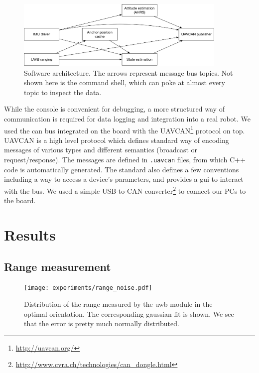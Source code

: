 \documentclass[a4paper, 12pt]{scrreprt}
\begin{document}
\begin{figure}[h]
    \centering
    \includegraphics[width=0.9\textwidth]{figures/architecture.pdf}
    \caption{Software architecture.
    The arrows represent message bus topics.
    Not shown here is the command shell, which can poke at almost every topic to inspect the data.
    }
    \label{fig:architecture}
\end{figure}

While the console is convenient for debugging, a more structured way of communication is required for data logging and integration into a real robot.
We used the \gls{can} bus integrated on the board with the UAVCAN\footnote{\url{http://uavcan.org/}} protocol on top.
UAVCAN is a high level protocol which defines standard way of encoding messages of various types and different semantics (broadcast or request/response).
The messages are defined in \texttt{.uavcan} files, from which C++ code is automatically generated.
The standard also defines a few conventions including a way to access a device's parameters, and provides a \gls{gui} to interact with the bus.
We used a simple USB-to-CAN converter\footnote{\url{http://www.cvra.ch/technologies/can_dongle.html}} to connect our PCs to the board.

\chapter{Results}

\section{Range measurement}
\label{sec:range_result}

\begin{figure}[h]
    \centering
    \texttt{[image: experiments/range\_noise.pdf]}
    \caption{Distribution of the range measured by the \gls{uwb} module in the optimal orientation.
        The corresponding gaussian fit is shown.
        We see that the error is pretty much normally distributed.
    }
    \label{fig:range_noise}
\end{figure}
\end{document}
